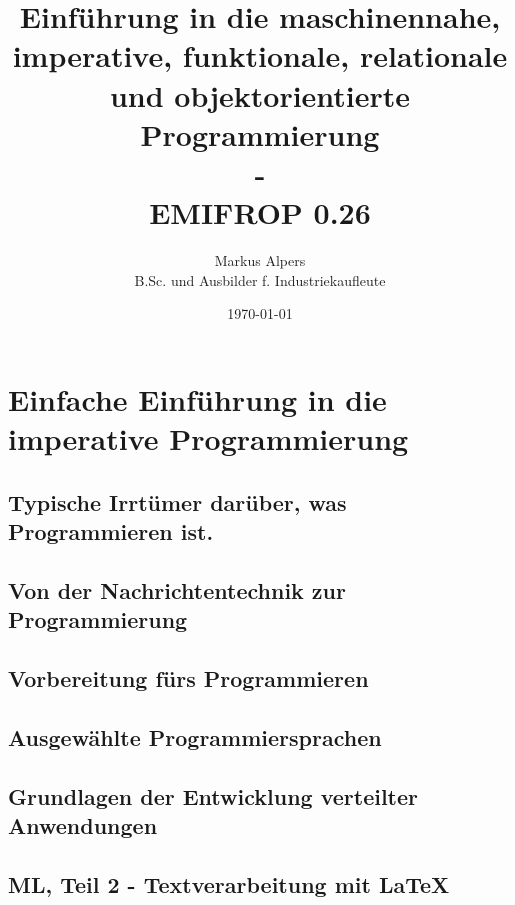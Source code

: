 \documentclass[11pt, a4paper, oneside, draft]{book}
\begin{document}

\title{Einführung in die maschinennahe, imperative, funktionale, relationale und objektorientierte Programmierung\\-\\EMIFROP 0.26}
\author{Markus Alpers\\B.Sc. und Ausbilder f. Industriekaufleute}
\date{\today}

\maketitle


\tableofcontents


%

\part{Einfache Einführung in die imperative Programmierung}

%
\chapter[Das ist Programmieren (wirklich)]{Typische Irrtümer darüber, was Programmieren ist.}
%
\chapter[Nachrichtentechnik und Programmierung]{Von der Nachrichtentechnik zur Programmierung}
%
\chapter{Vorbereitung fürs Programmieren}
%
\chapter{Ausgewählte Programmiersprachen}

%
\chapter[Grundlagen verteilter Anwendungen]{Grundlagen der Entwicklung verteilter Anwendungen}


\chapter{ML, Teil 2 - Textverarbeitung mit LaTeX}
%
\end{document}
